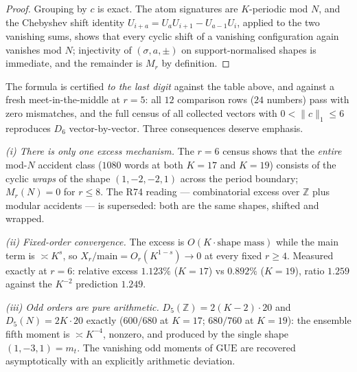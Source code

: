 \documentclass[11pt,reqno]{amsart}
\theoremstyle{definition}
\newcommand{\ZZ}{\mathbb{Z}}
\newcommand{\GUE}{\mathrm{GUE}}
\begin{document}
\begin{proof}
Grouping by $c$ is exact.  The atom signatures are $K$-periodic mod $N$, and the
Chebyshev shift identity $U_{i+a}=U_aU_{i+1}-U_{a-1}U_i$, applied to the two
vanishing sums, shows that every cyclic shift of a vanishing configuration again
vanishes mod $N$; injectivity of $(\sigma,a,\pm)$ on support-normalised shapes is
immediate, and the remainder is $M_r$ by definition.
\end{proof}

The formula is certified \emph{to the last digit} against the table above, and
against a fresh meet-in-the-middle at $r=5$: all $12$ comparison rows ($24$
numbers) pass with zero mismatches, and the full
census of all collected vectors with $0<\|c\|_1\le6$ reproduces $D_6$
vector-by-vector.  Three consequences deserve emphasis.

\emph{(i) There is only one excess mechanism.}  The $r=6$ census shows that the
\emph{entire} mod-$N$ accident class ($1080$ words at both $K=17$ and $K=19$)
consists of the cyclic \emph{wraps} of the shape $(1,-2,-2,1)$ across the period
boundary; $M_r(N)=0$ for $r\le8$.  The R74 reading --- combinatorial excess over
$\ZZ$ plus modular accidents --- is superseded: both are the same shapes, shifted
and wrapped.

\emph{(ii) Fixed-order convergence.}  The excess is $O(K\cdot\text{shape mass})$
while the main term is $\asymp K^s$, so $X_r/\text{main}=O_r(K^{1-s})\to0$ at
every fixed $r\ge4$.  Measured exactly at $r=6$: relative excess $1.123\%$
($K=17$) vs $0.892\%$ ($K=19$), ratio $1.259$ against the $K^{-2}$ prediction
$1.249$.

\emph{(iii) Odd orders are pure arithmetic.}  $D_5(\ZZ)=2(K-2)\cdot20$ and
$D_5(N)=2K\cdot20$ exactly ($600/680$ at $K=17$; $680/760$ at $K=19$): the
ensemble fifth moment is $\asymp K^{-4}$, nonzero, and produced by the single
shape $(1,-3,1)=m_t$.  The vanishing odd moments of $\GUE$ are recovered
asymptotically with an explicitly arithmetic deviation.
\end{document}
